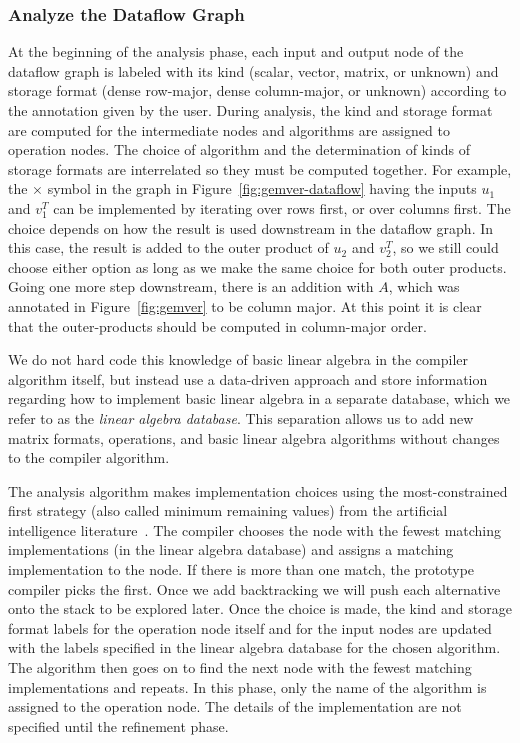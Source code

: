 \documentclass[11pt]{article}
\begin{document}
\subsubsection{Analyze the Dataflow Graph}

At the beginning of the analysis phase, each input and output node of the dataflow graph is labeled with its kind (scalar, vector, matrix, or unknown) and storage format (dense row-major, dense column-major, or unknown) according to the annotation given by the user.  During analysis, the kind and storage format are computed for the intermediate nodes and algorithms are assigned to operation nodes. The choice of algorithm and the determination of kinds of storage formats are interrelated so they must be computed together.  For example, the $\times$ symbol in the graph in Figure~\ref{fig:gemver-dataflow} having the inputs $u_1$ and $v_1^T$ can be implemented by iterating over rows first, or over columns first. The choice depends on how the result is used downstream in the dataflow graph.  In this case, the result is added to the outer product of $u_2$ and $v_2^T$, so we still could choose either option as long as we make the same choice for both outer products. Going one more step downstream, there is an addition with $A$, which was annotated in Figure~\ref{fig:gemver} to be column major. At this point it is clear that the outer-products should be computed in column-major order.

We do not hard code this knowledge of basic linear algebra in the compiler algorithm itself, but instead use a data-driven approach and store information regarding how to implement basic linear algebra in a separate database, which we refer to as the \emph{linear algebra database}.  This separation allows us to add new matrix formats, operations, and basic linear algebra algorithms without changes to the
compiler algorithm. 

The analysis algorithm makes implementation choices using the most-constrained first strategy (also called minimum remaining values)
from the artificial intelligence literature~\cite{Russell:2003mz}.
The compiler chooses the node with the fewest matching implementations (in the linear algebra database) and assigns a matching implementation to the node.  If there is more than one match, the prototype compiler picks the first.  Once we add backtracking we will push each alternative onto the stack to be explored later. Once the choice is made, the kind and storage format labels for the operation node itself and for the input nodes are updated with the labels specified in the linear algebra database for the chosen algorithm. The algorithm then goes on to find the next node with the fewest matching implementations and repeats.  In this phase, only the name of the algorithm is assigned to the operation node.  The details of the implementation are not specified until the refinement phase.
\end{document}
